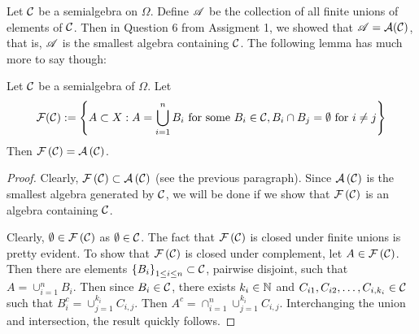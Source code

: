 Let ${\cal C}$ be a semialgebra on $\Omega$. Define ${\mathscr A}$ be the collection of all finite unions of elements of ${\cal C}$. Then in Question 6 from Assigment 1, we showed that ${\mathscr A} = {\cal A} ({\cal C})$, that is, ${\mathscr A}$ is the smallest algebra containing ${\cal C}$.
The following lemma has much more to say though:

\begin{lemma}
Let ${\cal C}$ be a semialgebra of $\Omega$. Let $${\cal F} ({\cal C}) := \left\{ A \subset X: A= \bigcup_{i=1}^{n} B_i \text{ for some } B_i \in {\cal C}, B_i \cap B_j = \emptyset \text{ for } i\ne j\right\}$$
Then ${\cal F} \left( {\cal C} \right) = {\cal A} \left( {\cal C} \right)$.
    \label{lemma:disjoint-algebra-generated}
\end{lemma}
\begin{proof}
    Clearly, ${\cal F} \left( {\cal C} \right) \subset {\cal A} \left( {\cal C} \right)$ (see the previous paragraph). Since ${\cal A} \left( {\cal C} \right)$ is the smallest algebra generated by ${\cal C}$, we will be done if we show that ${\cal F} \left( {\cal C} \right)$ is an algebra containing ${\cal C}$. 

    Clearly, $\emptyset \in {\cal F} \left( {\cal C} \right)$ as $\emptyset \in {\cal C}$. The fact that ${\cal F} \left( {\cal C} \right)$ is closed under finite unions is pretty evident. To show that ${\cal F} \left( {\cal C} \right)$ is closed under complement, let $A\in {\cal F} \left( {\cal C} \right)$. Then there are elements $\left\{ B_i \right\}_{1\le i \le n} \subset {\cal C}$, pairwise disjoint, such that $A=\cup_{i=1}^{n} B_i$. Then since $B_i \in {\cal C}$, there exists $k_i \in \mathbb N$ and $C_{i1} , C_{i2} , \ldots , C_{i,k_i} \in {\cal C}$ such that $B_i ^c = \cup_{j=1}^{k_i} C_{i,j}$. Then $A^c=\cap_{i=1}^{n} \cup_{j=1}^{k_i} C_{i,j}$. Interchanging the union and intersection, the result quickly follows.
\end{proof}

